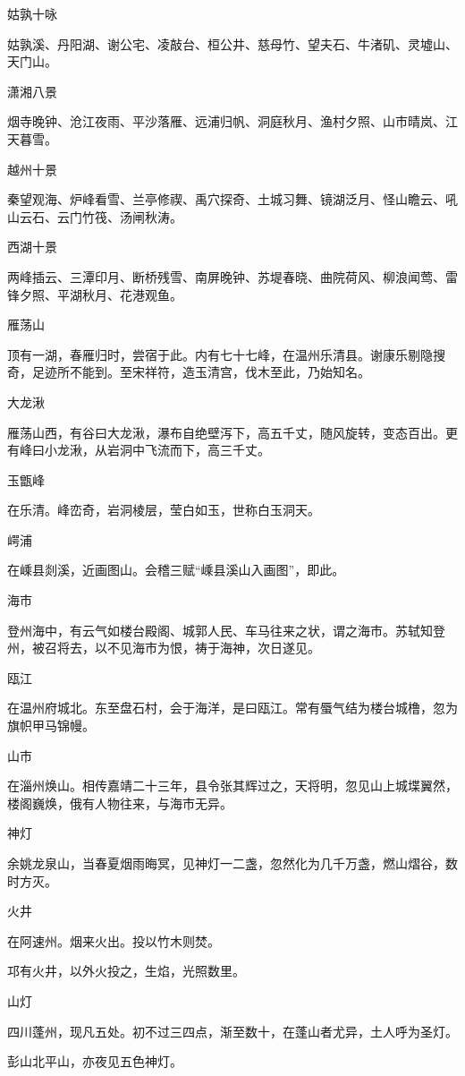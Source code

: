 \documentclass[a4paper,12pt,UTF8,twoside]{ctexbook}
\begin{document}
姑孰十咏

姑孰溪、丹阳湖、谢公宅、凌敲台、桓公井、慈母竹、望夫石、牛渚矶、灵墟山、天门山。

潇湘八景

烟寺晚钟、沧江夜雨、平沙落雁、远浦归帆、洞庭秋月、渔村夕照、山市晴岚、江天暮雪。

越州十景

秦望观海、炉峰看雪、兰亭修禊、禹穴探奇、土城习舞、镜湖泛月、怪山瞻云、吼山云石、云门竹筏、汤闸秋涛。

西湖十景

两峰插云、三潭印月、断桥残雪、南屏晚钟、苏堤春晓、曲院荷风、柳浪闻莺、雷锋夕照、平湖秋月、花港观鱼。

雁荡山

顶有一湖，春雁归时，尝宿于此。内有七十七峰，在温州乐清县。谢康乐剔隐搜奇，足迹所不能到。至宋祥符，造玉清宫，伐木至此，乃始知名。

大龙湫

雁荡山西，有谷曰大龙湫，瀑布自绝壁泻下，高五千丈，随风旋转，变态百出。更有峰曰小龙湫，从岩洞中飞流而下，高三千丈。

玉甑峰

在乐清。峰峦奇，岩洞棱层，莹白如玉，世称白玉洞天。

崿浦

在嵊县剡溪，近画图山。会稽三赋“嵊县溪山入画图”，即此。

海市

登州海中，有云气如楼台殿阁、城郭人民、车马往来之状，谓之海市。苏轼知登州，被召将去，以不见海市为恨，祷于海神，次日遂见。

瓯江

在温州府城北。东至盘石村，会于海洋，是曰瓯江。常有蜃气结为楼台城橹，忽为旗帜甲马锦幔。

山市

在淄州焕山。相传嘉靖二十三年，县令张其辉过之，天将明，忽见山上城堞翼然，楼阁巍焕，俄有人物往来，与海市无异。

神灯

余姚龙泉山，当春夏烟雨晦冥，见神灯一二盏，忽然化为几千万盏，燃山熠谷，数时方灭。

火井

在阿速州。烟来火出。投以竹木则焚。

邛有火井，以外火投之，生焰，光照数里。

山灯

四川蓬州，现凡五处。初不过三四点，渐至数十，在蓬山者尤异，土人呼为圣灯。

彭山北平山，亦夜见五色神灯。
\end{document}

